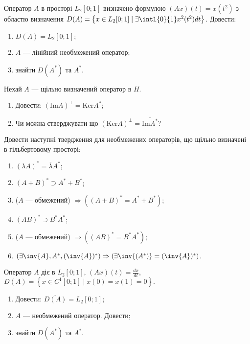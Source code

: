 \begin{exercise}
    Оператор $A$ в просторі $L_2[0;1]$ визначено формулою $(Ax)(t) = x(t^2)$ з областю визначення
    $D(A) = \left\{ x \in L_2[0;1] \mid \exists \intl{0}{1} x^2(t^2) dt \right\}$. Довести:
    \begin{enumerate}
        \item $\overline{D(A)} = L_2[0;1]$;
        \item $A$ --- лінійний необмежений оператор;
        \item знайти $D(A^*)$ та $A^*$.
    \end{enumerate}
\end{exercise}

\begin{exercise}
    Нехай $A$ --- щільно визначений оператор в $H$.
    \begin{enumerate}
        \item Довести: $(\mathrm{Im}A)^\perp = \mathrm{Ker}A^*$;
        \item Чи можна стверджувати що $(\mathrm{Ker}A)^\perp = \overline{\mathrm{Im}A^*}$?
    \end{enumerate}
\end{exercise}

\begin{exercise}
    Довести наступні твердження для необмежених операторів, що щільно визначені в гільбертовому
    просторі:
    \begin{enumerate}
        \item $(\lambda A)^* = \overline{\lambda} A^*$;
        \item $(A + B)^* \supset A^* + B^*$;
        \item ($A$ --- обмежений) $\Rightarrow \left( (A+B)^* = A^* + B^* \right)$;
        \item $(AB)^* \supset B^* A^*$;
        \item ($A$ --- обмежений) $\Rightarrow \left( (AB)^* = B^* A^* \right)$;
        \item $\left( \exists \inv{A}, A^*, (\inv{A})^* \right) \Rightarrow
               \left( \exists \inv{(A^*)} = (\inv{A})^* \right)$.
    \end{enumerate}
\end{exercise}

\begin{exercise}
    Оператор $A$ діє в $L_2[0;1]$, $(Ax)(t) = \frac{dx}{dt}$,
    $D(A) = \left\{
        x \in C^1[0;1] \mid x(0) = x(1) = 0
    \right\}.$
    \begin{enumerate}
        \item Довести: $\overline{D(A)} = L_2[0;1]$;
        \item $A$ --- необмежений оператор. Довести;
        \item знайти $D(A^*)$ та $A^*$. 
    \end{enumerate}
\end{exercise}

